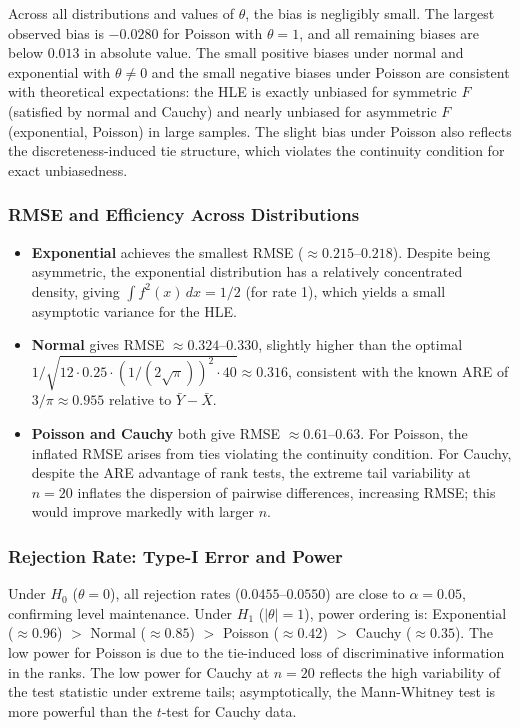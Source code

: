 \documentclass[10pt]{article}
\begin{document}
Across all distributions and values of $\theta$, the bias is negligibly small. The largest observed bias is $-0.0280$ for Poisson with $\theta = 1$, and all remaining biases are below $0.013$ in absolute value. The small positive biases under normal and exponential with $\theta \neq 0$ and the small negative biases under Poisson are consistent with theoretical expectations: the HLE is exactly unbiased for symmetric $F$ (satisfied by normal and Cauchy) and nearly unbiased for asymmetric $F$ (exponential, Poisson) in large samples. The slight bias under Poisson also reflects the discreteness-induced tie structure, which violates the continuity condition for exact unbiasedness.

\subsubsection{RMSE and Efficiency Across Distributions}

\begin{itemize}
    \item \textbf{Exponential} achieves the smallest RMSE ($\approx 0.215$--$0.218$). Despite being asymmetric, the exponential distribution has a relatively concentrated density, giving $\int f^2(x)\,dx = 1/2$ (for rate 1), which yields a small asymptotic variance for the HLE.
    \item \textbf{Normal} gives RMSE $\approx 0.324$--$0.330$, slightly higher than the optimal $1/\sqrt{12 \cdot 0.25 \cdot (1/(2\sqrt{\pi}))^2 \cdot 40} \approx 0.316$, consistent with the known ARE of $3/\pi \approx 0.955$ relative to $\bar{Y} - \bar{X}$.
    \item \textbf{Poisson and Cauchy} both give RMSE $\approx 0.61$--$0.63$. For Poisson, the inflated RMSE arises from ties violating the continuity condition. For Cauchy, despite the ARE advantage of rank tests, the extreme tail variability at $n=20$ inflates the dispersion of pairwise differences, increasing RMSE; this would improve markedly with larger $n$.
\end{itemize}

\subsubsection{Rejection Rate: Type-I Error and Power}

Under $H_0$ ($\theta = 0$), all rejection rates ($0.0455$--$0.0550$) are close to $\alpha = 0.05$, confirming level maintenance. Under $H_1$ ($|\theta| = 1$), power ordering is: Exponential ($\approx 0.96$) $>$ Normal ($\approx 0.85$) $>$ Poisson ($\approx 0.42$) $>$ Cauchy ($\approx 0.35$). The low power for Poisson is due to the tie-induced loss of discriminative information in the ranks. The low power for Cauchy at $n=20$ reflects the high variability of the test statistic under extreme tails; asymptotically, the Mann-Whitney test is more powerful than the $t$-test for Cauchy data.
\end{document}
